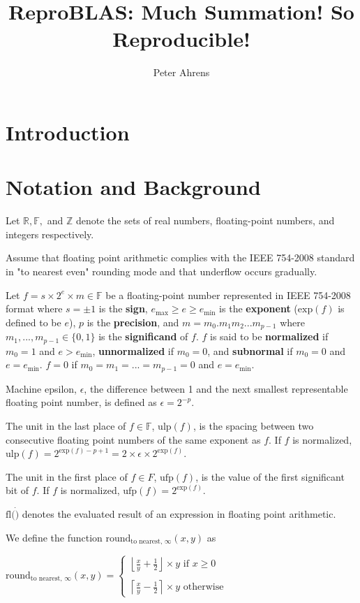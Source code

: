 \documentclass[12pt]{article}
\author{Peter Ahrens}
\title{ReproBLAS: Much Summation! So Reproducible!}
\providecommand{\ceil}[1]{\left \lceil #1 \right \rceil }
\providecommand{\floor}[1]{\left \lfloor #1 \right \rfloor }
\providecommand{\R}{\ensuremath{\mathbb{R}}}
\providecommand{\F}{\ensuremath{\mathbb{F}}}
\providecommand{\Z}{\ensuremath{\mathbb{Z}}}
\providecommand{\exp}{\ensuremath{\text{exp}}}
\providecommand{\min}{\ensuremath{\text{min}}}
\providecommand{\max}{\ensuremath{\text{max}}}
\providecommand{\ulp}{\ensuremath{\text{ulp}}}
\providecommand{\ufp}{\ensuremath{\text{ufp}}}
\providecommand{\fl}{\ensuremath{\text{fl}}}
\providecommand{\roundtonearestinfty}{\ensuremath{\text{round}_\text{to nearest, $\infty$}}}
\theoremstyle{plain}
\begin{document}
\noindent
\maketitle
\tableofcontents
\newpage
\section{Introduction}

\section{Notation and Background}
  Let $\R, \F, $ and $\Z$ denote the sets of real numbers, floating-point numbers, and integers respectively.

  Assume that floating point arithmetic complies with the IEEE 754-2008 standard \cite{ieee754} in "to nearest even" rounding mode and that underflow occurs gradually.

  Let $f = s \times 2^e \times m \in \F$ be a floating-point number represented in IEEE 754-2008 format \cite{ieee754} where $s = \pm 1$ is the \textbf{sign}, $e_{\max} \geq e \geq e_{\min}$ is the \textbf{exponent} ($\exp(f)$ is defined to be $e$), $p$ is the \textbf{precision}, and $m = m_0.m_1m_2...m_{p-1}$ where $m_1, ..., m_{p - 1} \in \{0, 1\}$ is the \textbf{significand} of $f$. $f$ is said to be \textbf{normalized} if $m_0 = 1$ and $e > e_{\min}$, \textbf{unnormalized} if $m_0 = 0$, and \textbf{subnormal} if $m_0 = 0$ and $e = e_{\min}$. $f = 0$ if $m_0 = m_1 = ... = m_{p - 1} = 0$ and $e = e_{\min}$.

  Machine epsilon, $\epsilon$, the difference between 1 and the next smallest representable floating point number, is defined as $\epsilon = 2^{-p}$.

  The unit in the last place of $f \in \F$, $\ulp(f)$, is the spacing between two consecutive floating point numbers of the same exponent as $f$. If $f$ is normalized, $\ulp(f) = 2^{\exp(f) - p + 1} = 2 \times \epsilon \times 2^{\exp(f)}$.

  The unit in the first place of $f \in F$, $\ufp(f)$, is the value of the first significant bit of $f$. If $f$ is normalized, $\ufp(f) = 2^{\exp(f)}$.

  $\fl(\dot)$ denotes the evaluated result of an expression in floating point arithmetic.

  We define the function $\roundtonearestinfty(x, y)$ as

  $\roundtonearestinfty(x, y) = \begin{cases}\floor{\frac{x}{y} + \frac{1}{2}} \times y \text{ if } x \geq 0\\ \\ \ceil{\frac{x}{y} - \frac{1}{2}}\times y \text{ otherwise}\end{cases}$
\end{document}
